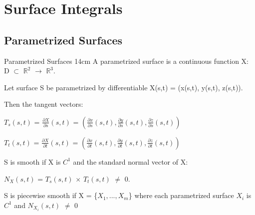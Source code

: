 \newpage

\section[Day 6: Surface Integrals]{ Surface Integrals }

\subsection{ Parametrized Surfaces }

    \begin{definition}{ Parametrized Surfaces }{14cm}
        A {\color{lblue} parametrized surface}
        is a continuous function X: D $\subset$ $\mathbb{R}^2$
        $\rightarrow$ $\mathbb{R}^3$.

        \vspace{0.5cm}

        Let surface S be parametrized by
        differentiable X(s,t) = (x(s,t), y(s,t), z(s,t)).

        Then the tangent vectors:

        \hspace{0.5cm}
        $T_s(s,t)$
        = $\frac{\partial X}{\partial s}(s,t)$
        = $(\frac{\partial x}{\partial s}(s,t),
            \frac{\partial y}{\partial s}(s,t),
            \frac{\partial z}{\partial s}(s,t))$

        \hspace{0.5cm}
        $T_t(s,t)$
        = $\frac{\partial X}{\partial t}(s,t)$
        = $(\frac{\partial x}{\partial t}(s,t),
            \frac{\partial y}{\partial t}(s,t),
            \frac{\partial z}{\partial t}(s,t))$

        S is {\color{lblue} smooth} if X is $C^1$ and the
        {\color{lblue} standard normal vector} of X:

        \hspace{0.5cm}
        $N_X(s,t)$ = $T_s(s,t)$ $\times$ $T_t(s,t)$ $\not =$ 0.

        S is {\color{lblue} piecewise smooth} if
        X = \{$X_1,...,X_m$\} where each parametrized surface $X_i$
        is $C^1$ and $N_{X_i}(s,t)$ $\not =$ 0
    \end{definition}

    \vspace{0.5cm}




